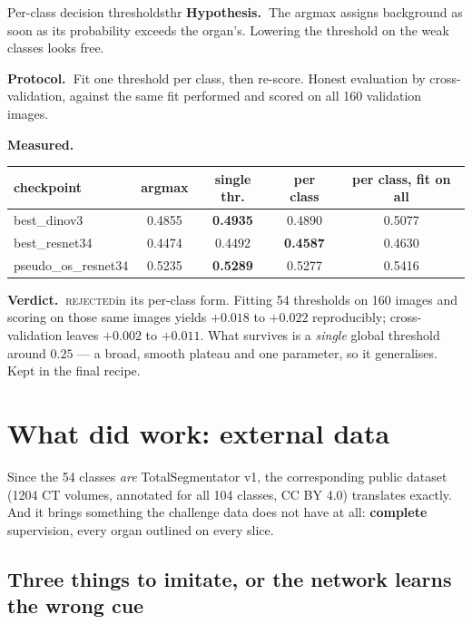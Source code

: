 \documentclass{article}
\newcommand{\hyp}{\textbf{Hypothesis.\ }}
\newcommand{\proto}{\textbf{Protocol.\ }}
\newcommand{\meas}{\textbf{Measured.\ }}
\newcommand{\verd}{\textbf{Verdict.\ }}
\newcommand{\rejected}{\textcolor{myred}{\textsc{rejected}}}
\begin{document}
\begin{expfail}{Per-class decision thresholds}{thr}
\hyp The argmax assigns background as soon as its probability exceeds the
organ's. Lowering the threshold on the weak classes looks free.

\proto Fit one threshold per class, then re-score. Honest evaluation by
cross-validation, against the same fit performed and scored on all 160 validation
images.

\meas
\begin{center}
\begin{tabular}{lcccc}
\hline
\textbf{checkpoint} & \textbf{argmax} & \textbf{single thr.} & \textbf{per class} & \textbf{per class, fit on all} \\
\hline
best\_dinov3 & 0.4855 & \textbf{0.4935} & 0.4890 & 0.5077 \\
best\_resnet34 & 0.4474 & 0.4492 & \textbf{0.4587} & 0.4630 \\
pseudo\_os\_resnet34 & 0.5235 & \textbf{0.5289} & 0.5277 & 0.5416 \\
\hline
\end{tabular}
\end{center}

\verd \rejected in its per-class form. Fitting 54 thresholds on 160 images and
scoring on those same images yields $+0.018$ to $+0.022$ reproducibly;
cross-validation leaves $+0.002$ to $+0.011$. What survives is a \emph{single}
global threshold around $0.25$ --- a broad, smooth plateau and one parameter, so
it generalises. Kept in the final recipe.
\end{expfail}

\newpage

\section{What did work: external data}
\label{sec:external}

Since the 54 classes \emph{are} TotalSegmentator v1, the corresponding public
dataset (1204 CT volumes, annotated for all 104 classes, CC BY 4.0) translates
exactly. And
it brings something the challenge data does not have at all: \textbf{complete}
supervision, every organ outlined on every slice.

\subsection{Three things to imitate, or the network learns the wrong cue}
\end{document}
